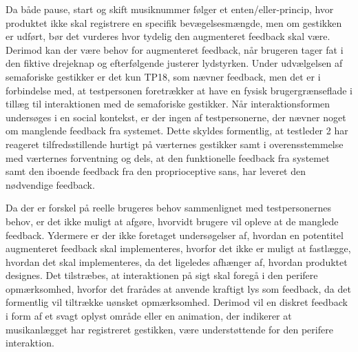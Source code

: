 Da både pause, start og skift musiknummer følger et enten/eller-princip, hvor produktet ikke skal registrere en specifik bevægelsesmængde, men om gestikken er udført, bør det vurderes hvor tydelig den augmenteret feedback skal være. Derimod kan der være behov for augmenteret feedback, når brugeren tager fat i den fiktive drejeknap og efterfølgende justerer lydstyrken.\blankline
%
Under udvælgelsen af semaforiske gestikker er det kun TP18, som nævner feedback, men det er i forbindelse med, at testpersonen foretrækker at have en fysisk brugergrænseflade i tillæg til interaktionen med de semaforiske gestikker. Når interaktionsformen undersøges i en social kontekst, er der ingen af testpersonerne, der nævner noget om manglende feedback fra systemet. Dette skyldes formentlig, at testleder 2 har reageret tilfredsstillende hurtigt på værternes gestikker samt i overensstemmelse med værternes forventning og dels, at den funktionelle feedback fra systemet samt den iboende feedback fra den proprioceptive sans, har leveret den nødvendige feedback.

Da der er forskel på reelle brugeres behov sammenlignet med testpersonernes behov, er det ikke muligt at afgøre, hvorvidt brugere vil opleve at de manglede feedback. Ydermere er der ikke foretaget undersøgelser af, hvordan en potentitel augmenteret feedback skal implementeres, hvorfor det ikke er muligt at fastlægge, hvordan det skal implementeres, da det ligeledes afhænger af, hvordan produktet designes. Det tilstræbes, at interaktionen på sigt skal foregå i den perifere opmærksomhed, hvorfor det frarådes at anvende kraftigt lys som feedback, da det formentlig vil tiltrække uønsket opmærksomhed. Derimod vil en diskret feedback i form af et svagt oplyst område eller en animation, der indikerer at musikanlægget har registreret gestikken, være understøttende for den perifere interaktion.
%

